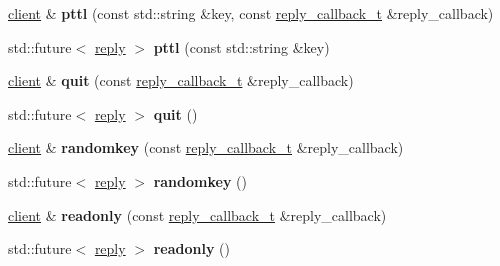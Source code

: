 \begin{DoxyCompactItemize}
\mbox{\hyperlink{classcpp__redis_1_1client}{client}} \& {\bfseries pttl} (const std\+::string \&key, const \mbox{\hyperlink{classcpp__redis_1_1client_af7a65eb21aa25230bfbb0b0203c4fc04}{reply\+\_\+callback\+\_\+t}} \&reply\+\_\+callback)
\item 
\mbox{\label{classcpp__redis_1_1client_adf173046c5866f6a9b9cd297a79b3028}} 
std\+::future$<$ \mbox{\hyperlink{classcpp__redis_1_1reply}{reply}} $>$ {\bfseries pttl} (const std\+::string \&key)
\item 
\mbox{\label{classcpp__redis_1_1client_a455952961bd95a22630d1bd6c6a3f7a7}} 
\mbox{\hyperlink{classcpp__redis_1_1client}{client}} \& {\bfseries quit} (const \mbox{\hyperlink{classcpp__redis_1_1client_af7a65eb21aa25230bfbb0b0203c4fc04}{reply\+\_\+callback\+\_\+t}} \&reply\+\_\+callback)
\item 
\mbox{\label{classcpp__redis_1_1client_a0b13beda169ce74720abf4bba2d69d68}} 
std\+::future$<$ \mbox{\hyperlink{classcpp__redis_1_1reply}{reply}} $>$ {\bfseries quit} ()
\item 
\mbox{\label{classcpp__redis_1_1client_a7ec81f685738479307e464db273201e6}} 
\mbox{\hyperlink{classcpp__redis_1_1client}{client}} \& {\bfseries randomkey} (const \mbox{\hyperlink{classcpp__redis_1_1client_af7a65eb21aa25230bfbb0b0203c4fc04}{reply\+\_\+callback\+\_\+t}} \&reply\+\_\+callback)
\item 
\mbox{\label{classcpp__redis_1_1client_a021538472ad199d7a203a77af6aba96c}} 
std\+::future$<$ \mbox{\hyperlink{classcpp__redis_1_1reply}{reply}} $>$ {\bfseries randomkey} ()
\item 
\mbox{\label{classcpp__redis_1_1client_a14353780458071311d074fd951201f93}} 
\mbox{\hyperlink{classcpp__redis_1_1client}{client}} \& {\bfseries readonly} (const \mbox{\hyperlink{classcpp__redis_1_1client_af7a65eb21aa25230bfbb0b0203c4fc04}{reply\+\_\+callback\+\_\+t}} \&reply\+\_\+callback)
\item 
\mbox{\label{classcpp__redis_1_1client_acbf4ef53964a7e451793c17b9ac103ee}} 
std\+::future$<$ \mbox{\hyperlink{classcpp__redis_1_1reply}{reply}} $>$ {\bfseries readonly} ()

\end{DoxyCompactItemize}
